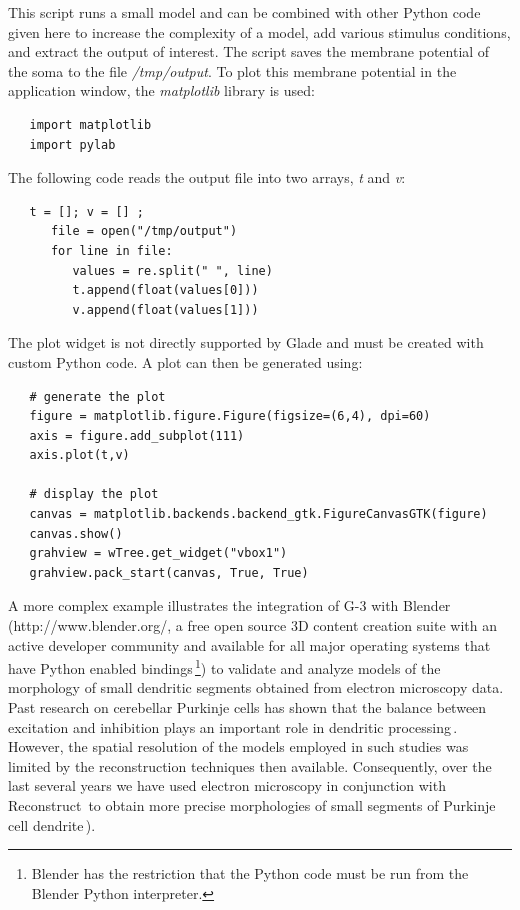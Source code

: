 \documentclass[12pt]{article}
\begin{document}
This script runs a small model and can be combined with other Python
code given here to increase the complexity of a model, add various
stimulus conditions, and extract the output of interest.  The script
saves the membrane potential of the soma to the file {\it
  /tmp/output}.  To plot this membrane potential in the application
window, the {\it matplotlib} library is used:

{\footnotesize
  \resetlinenumber[5]
\begin{verbatim}
   import matplotlib
   import pylab
\end{verbatim}
}

The following code reads the output file into two arrays, {\it t} and
{\it v}:

{\footnotesize
  \resetlinenumber[5]
\begin{verbatim}
   t = []; v = [] ;
      file = open("/tmp/output")
      for line in file:
         values = re.split(" ", line)
         t.append(float(values[0]))
         v.append(float(values[1]))
\end{verbatim}
}

The plot widget is not directly supported by Glade and must be created
with custom Python code.  A plot can then be generated using:

{\footnotesize
  \resetlinenumber[5]
\begin{verbatim}
   # generate the plot
   figure = matplotlib.figure.Figure(figsize=(6,4), dpi=60)
   axis = figure.add_subplot(111)
   axis.plot(t,v)

   # display the plot
   canvas = matplotlib.backends.backend_gtk.FigureCanvasGTK(figure)
   canvas.show()
   grahview = wTree.get_widget("vbox1")
   grahview.pack_start(canvas, True, True)
\end{verbatim}
}

A more complex example illustrates the integration of G-3 with Blender
(http://www.blender.org/, a free open source 3D content creation suite
with an active developer community and available for all major
operating systems that have Python enabled bindings\,\footnote{Blender
  has the restriction that the Python code must be run from the
  Blender Python interpreter.}) to validate and analyze models of the
morphology of small dendritic segments obtained from electron
microscopy data. Past research on cerebellar Purkinje cells has shown
that the balance between excitation and inhibition plays an important
role in dendritic processing\,\cite{santamaria02:_modul_purkin,
  mittmann07:_linkin_purkin}.  However, the spatial resolution of the
models employed in such studies was limited by the reconstruction
techniques then available.  Consequently, over the last several years
we have used electron microscopy in conjunction with
Reconstruct\,\cite{jc05:_recon}
to obtain more precise morphologies of small segments of Purkinje cell
dendrite\,\cite{lu09:_d_purkin, cornelis08:_model_neuros_genes}).
\end{document}
